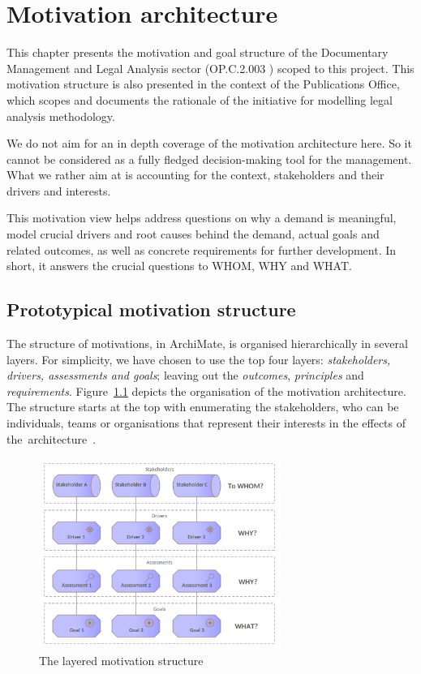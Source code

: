 \chapter{Motivation architecture}
\label{sec:motivation-architecture}

	This chapter presents the motivation and goal structure of the Documentary Management and Legal Analysis sector (OP.C.2.003 ) scoped to this project. This motivation structure is also presented in the context of the Publications Office, which scopes and documents the rationale of the initiative for modelling legal analysis methodology. 
	
	We do not aim for an in depth coverage of the motivation architecture here. So it cannot be considered as a fully fledged decision-making tool for the management. What we rather aim at is accounting for the context, stakeholders and their drivers and interests. 
	
	This motivation view helps address questions on why a demand is meaningful, model crucial drivers and root causes behind the demand, actual goals and related outcomes, as well as concrete requirements for further development. In short, it answers the crucial questions to WHOM, WHY and WHAT.
	
	\section{Prototypical motivation structure}
	\label{sec:how-to-motivation}		
	
	The structure of motivations, in ArchiMate, is organised hierarchically in several layers. For simplicity, we have chosen to use the top four layers: \textit{stakeholders, drivers, assessments and goals}; leaving out the \textit{outcomes}, \textit{principles} and \textit{requirements}. \mbox{Figure \ref{fig:morivation-structure}} depicts the organisation of the motivation architecture. The structure starts at the top with enumerating the stakeholders, who can be individuals, teams or organisations that represent their interests in the effects of \mbox{the architecture \citep{archimate3.1}}. 
	
	\begin{figure}[h]
		\centering
		\includegraphics[width=0.7\textwidth]{images/views/Motivation view.png}
		\caption{The layered motivation structure}
		\label{fig:morivation-structure}
	\end{figure}
	
